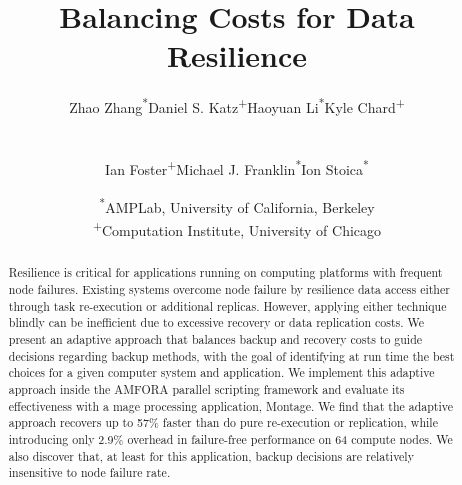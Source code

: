 \documentclass{sig-alternate}
\begin{document}

\title{Balancing Costs for Data Resilience}

\author{
\begin{tabular}{cccc}
{Zhao Zhang\textsuperscript{*}} & {Daniel S. Katz\textsuperscript{+}} & {Haoyuan Li\textsuperscript{*}} & {Kyle Chard\textsuperscript{+}} 
\end{tabular}
\\
\begin{tabular}{ccc}
{Ian Foster\textsuperscript{+}} & {Michael J. Franklin\textsuperscript{*}} & {Ion Stoica\textsuperscript{*}}
\end{tabular}
\and %
\begin{tabular}{c}
\textsuperscript{*}AMPLab, University of California, Berkeley \\
\textsuperscript{+}Computation Institute, University of Chicago
\end{tabular}
} 

\maketitle



\begin{abstract}
Resilience is critical for applications running on computing platforms with frequent node failures.
Existing systems overcome node failure by resilience data access either through task re-execution or additional replicas.
However, applying either technique blindly can be inefficient due to 
excessive recovery or data replication costs.
We present an adaptive approach that balances backup and
recovery costs to guide decisions regarding backup methods, with the goal of identifying
at run time the best choices for a given computer system and application.
We implement this adaptive approach inside the AMFORA parallel scripting framework
and evaluate its effectiveness with a mage processing application, Montage.
We find that the adaptive approach recovers up to 57\% faster than
do pure re-execution or replication, while introducing only 2.9\% overhead in failure-free performance on 64 compute nodes.
We also discover that, at least for this application, backup decisions are relatively insensitive to node failure rate.
\end{abstract}
\end{document}
